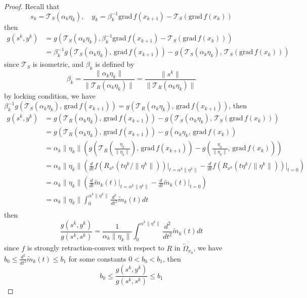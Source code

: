 \documentclass[12pt,a4paper,draft]{article}  %
\theoremstyle{definition}
\numberwithin{equation}{section}
\newcommand{\grad}{\mathrm{grad}\,}
\begin{document}
\begin{proof}
        Recall that
        \[
        s_k = \mathcal{T}_S(\alpha_k \eta_k), \quad y_k = \beta_k^{-1}\grad f(x_{k+1}) - \mathcal{T}_S(\grad f(x_k))
        \]
        then
        \[
        \begin{aligned}
            g(s^k,y^k) &= g\left(\mathcal{T}_S(\alpha_k \eta_k), \beta_k^{-1}\grad f(x_{k+1}) - \mathcal{T}_S(\grad f(x_k))\right)\\
            &= \beta_k^{-1}g\left(\mathcal{T}_S(\alpha_k\eta_k),\, \grad f(x_{k+1})\right) - g\!\left(\mathcal{T}_S(\alpha_k\eta_k),\, \mathcal{T}_S(\grad f(x_k))\right)    
        \end{aligned}
        \]
        since $\mathcal{T}_S$ is isometric, and $\beta_k$ is defined by
        \[
\beta_k = \frac{\|\alpha_k\eta_k\|}{\|\mathcal{T}_R(\alpha_k\eta_k)\|} = \frac{\|s^k\|}{\|\mathcal{T}_R(\alpha_k\eta_k)\|}
        \]
        by locking condition, we have $\beta_k^{-1}g\left(\mathcal{T}_S(\alpha_k\eta_k),\, \grad f(x_{k+1})\right) = g\left(\mathcal{T}_R(\alpha_k\eta_k),\, \grad f(x_{k+1})\right)$, then
        \[
        \begin{aligned}
            g(s^k,y^k) &= g\left(\mathcal{T}_R(\alpha_k\eta_k),\, \grad f(x_{k+1})\right) - g\!\left(\mathcal{T}_S(\alpha_k\eta_k),\, \mathcal{T}_S(\grad f(x_k))\right)\\
            &= g\left(\mathcal{T}_R(\alpha_k\eta_k),\, \grad f(x_{k+1})\right) - g\!\left(\alpha_k\eta_k,\, \grad f(x_k)\right)\\
            &= \alpha_k\|\eta_k\|\left(g\left(\mathcal{T}_R\left(\frac{\eta_k}{\|\eta_k\|}\right),\, \grad f(x_{k+1})\right) - g\!\left(\frac{\eta_k}{\|\eta_k\|},\, \grad f(x_k)\right)\right)\\
            &= \alpha_k\|\eta_k\|\left(\frac{d}{dt}f\left(R_{x^k}(t\eta^k/\|\eta^k\|)\right)\Big|_{t=\alpha^k\|\eta^k\|} - \frac{d}{dt}f\left(R_{x^k}(t\eta^k/\|\eta^k\|)\right)\Big|_{t=0}\right)\\
            &= \alpha_k\|\eta_k\|\left(\frac{d}{dt}\widetilde{m}_k(t)\Big|_{t=\alpha^k\|\eta^k\|} - \frac{d}{dt}\widetilde{m}_k(t)\Big|_{t=0}\right)\\
            &=  \alpha_k\|\eta_k\|\int_0^{\alpha^k\|\eta^k\|}\frac{d^2}{dt^2}\widetilde{m}_k(t)dt\\
        \end{aligned}
        \]
        then
        \[
        \frac{g(s^k,y^k)}{g(s^k,s^k)} = \frac{1}{\alpha_k\|\eta_k\|}\int_0^{\alpha^k\|\eta^k\|}\frac{d^2}{dt^2}\widetilde{m}_k(t)dt
        \]
        since $f$ is strongly retraction-convex with respect to $R$ in $\overline{\widetilde{\Omega}_{x_0}}$, we have $b_0\leq \frac{d^2}{dt^2}\widetilde{m}_k(t) \leq b_1$ for some constants $0<b_0<b_1$, then
        \[
        b_0 \leq \frac{g(s^k,y^k)}{g(s^k,s^k)} \leq b_1
        \]
\end{proof}
\end{document}
